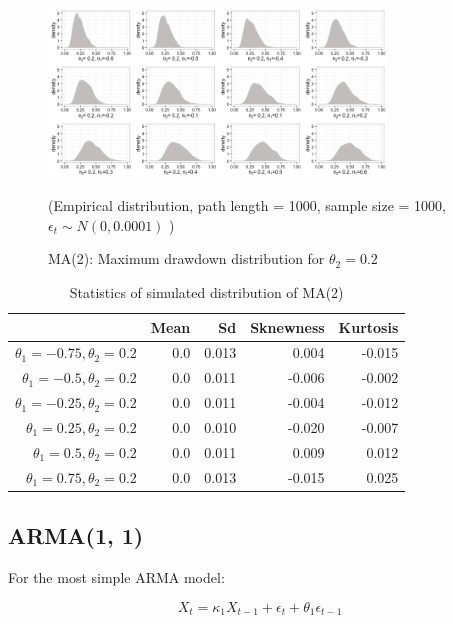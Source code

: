 \documentclass[11pt]{article}
\begin{document}
\begin{figure}[H]
\centering
\includegraphics[width = 0.8\textwidth]{../figures/simulation/MA2_maxDrawdown_dist_theta2_02}
\caption{MA(2): Maximum drawdown distribution for $\theta_2 = 0.2$}
(Empirical distribution, path length = 1000, sample size = 1000, $\epsilon_t \sim N(0, 0.0001)$ )
\label{fig:MA2_maxDrawdown_dist_theta2_02}
\end{figure}

\begin{table}[H]
\centering
\begin{tabular}{|r |r r r r|}
\hline
& Mean & Sd & Sknewness & Kurtosis \\
\hline
$\theta_1 = -0.75, \theta_2 = 0.2$ & 0.0 & 0.013 & 0.004 & -0.015\\
$\theta_1 = -0.5, \theta_2 = 0.2$ & 0.0 & 0.011 & -0.006 & -0.002\\
$\theta_1 = -0.25, \theta_2 = 0.2$ & 0.0 &  0.011 & -0.004 & -0.012\\
$\theta_1 = 0.25, \theta_2 = 0.2$ & 0.0 &  0.010 & -0.020 & -0.007\\
$\theta_1 = 0.5, \theta_2 = 0.2$ & 0.0 & 0.011 & 0.009 & 0.012\\
$\theta_1 = 0.75, \theta_2 = 0.2$ & 0.0 & 0.013 & -0.015 & 0.025\\
\hline
\end{tabular}
\caption{Statistics of simulated distribution of MA(2)}
\label{table: MA2_return}
\end{table}

\subsection{ARMA(1, 1)} %

For the most simple ARMA model:

\begin{equation}
X_t = \kappa_1X_{t-1} + \epsilon_t + \theta_1\epsilon_{t-1}
\end{equation}
\end{document}
